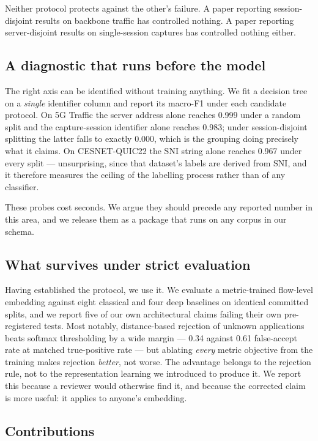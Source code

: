 Neither protocol protects against the other's failure. A paper reporting
session-disjoint results on backbone traffic has controlled nothing. A paper
reporting server-disjoint results on single-session captures has controlled
nothing either.

\subsection*{A diagnostic that runs before the model}

The right axis can be identified without training anything. We fit a decision
tree on a \emph{single} identifier column and report its macro-F1 under each
candidate protocol. On 5G Traffic the server address alone reaches 0.999 under
a random split and the capture-session identifier alone reaches 0.983; under
session-disjoint splitting the latter falls to exactly 0.000, which is the
grouping doing precisely what it claims. On CESNET-QUIC22 the SNI string alone
reaches 0.967 under every split --- unsurprising, since that dataset's labels
are derived from SNI, and it therefore measures the ceiling of the labelling
process rather than of any classifier.

These probes cost seconds. We argue they should precede any reported number in
this area, and we release them as a package that runs on any corpus in our
schema.

\subsection*{What survives under strict evaluation}

Having established the protocol, we use it. We evaluate a metric-trained
flow-level embedding against eight classical and four deep baselines on
identical committed splits, and we report five of our own architectural claims
failing their own pre-registered tests. Most notably, distance-based rejection
of unknown applications beats softmax thresholding by a wide margin --- 0.34
against 0.61 false-accept rate at matched true-positive rate --- but ablating
\emph{every} metric objective from the training makes rejection \emph{better},
not worse. The advantage belongs to the rejection rule, not to the
representation learning we introduced to produce it. We report this because a
reviewer would otherwise find it, and because the corrected claim is more
useful: it applies to anyone's embedding.

\subsection*{Contributions}

